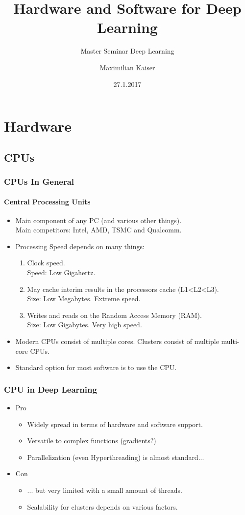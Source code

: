 \documentclass[9pt]{beamer}
\title[Hardware and Software for Deep Learning]{Hardware and Software for Deep Learning}
\subtitle{Master Seminar Deep Learning}
\author[Maximilian Kaiser]{Maximilian Kaiser}
\institute[Institut für Statistik \\ Ludwig-Maximilians-Universität]{Institut für Statistik \\ Ludwig-Maximilians-Universität}
\date{27.1.2017}
\begin{document}
\frame{\titlepage} 

\section{Hardware}
\subsection{CPUs}
\begin{frame}
\frametitle{CPUs In General}
\framesubtitle{Central Processing Units}
\begin{itemize}
\item Main component of any PC (and various other things).\\ Main competitors: Intel, AMD, TSMC and Qualcomm.
\item Processing Speed depends on many things:
\begin{enumerate}
\item Clock speed. \\ Speed: Low Gigahertz.
\item May cache interim results in the processors cache (L1<L2<L3). \\ Size: Low Megabytes. Extreme speed.
\item Writes and reads on the Random Access Memory (RAM). \\ Size: Low Gigabytes. Very high speed.
\end{enumerate}
\item Modern CPUs consist of multiple cores. Clusters consist of multiple multi-core CPUs.
\item Standard option for most software is to use the CPU.
\end{itemize}
\end{frame}

\begin{frame}
\frametitle{CPU in Deep Learning}
\begin{itemize}
\item Pro
\begin{itemize}
\item Widely spread in terms of hardware and software support.
\item Versatile to complex functions (gradients?)
\item Parallelization (even Hyperthreading) is almost standard...
\end{itemize}
\item Con
\begin{itemize}
\item ... but very limited with a small amount of threads.
\item Scalability for clusters depends on various factors.
\end{itemize}
\end{itemize}
\end{frame}
\end{document}
